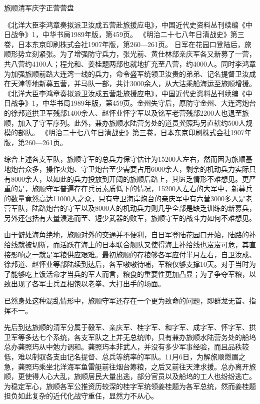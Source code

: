 \documentclass[12pt,UTF8]{ctexbook}
\begin{document}
旅顺清军庆字正营营盘

《北洋大臣李鸿章奏拟派卫汝成五营赴旅援应电》，中国近代史资料丛刊续编《中日战争》1，中华书局1989年版，第459页。
《明治二十七八年日清战史》第三卷，日本东京印刷株式会社1907年版，第260—261页。
日军在花园口登陆后，旅顺形势立刻紧张。为了增强防守兵力，张光前、黄仕林部亲庆军各又新募了一营，共八营约4100人；程允和、姜桂题两部也就地扩充至八营，约4000人。同时李鸿章为加强旅顺前路大连湾一线的兵力，命令盛军统领卫汝贵的弟弟、记名提督卫汝成在天津等地新募五营，并马队一部，共计3000余人，从大沽乘船海运至旅顺增援。 《北洋大臣李鸿章奏拟派卫汝成五营赴旅援应电》，中国近代史资料丛刊续编《中日战争》1，中华书局1989年版，第459页。金州失守后，原防守金州、大连湾炮台的徐邦道拱卫军残部1400余人、赵怀业怀字军以及铭军老营残部2200人也退至旅顺，加入了守军序列。此外，兼办旅顺水陆营务处的道员龚照玙另直辖约500人规模的部队。 《明治二十七八年日清战史》第三卷，日本东京印刷株式会社1907年版，第260—261页。

综合上述各支军队，旅顺守军的总兵力保守估计为15200人左右，然而因为旅顺基地炮台众多，操作火炮、守卫炮台至少需要占用6000余人，剩余的机动兵力实际只有8000余人，以如此的兵力投放到开阔的旅顺后路上，其匮乏情形不难想见。更严重的是，旅顺守军普遍存在兵员素质低下的情况，15200人左右的大军中，新募兵的数量竟然高达11000人之众，只有守卫海岸炮台的亲庆军中有六营3000多人是老营军队，陆路炮台的守军以及8000人的机动兵力则几乎全部是缺乏训练的新募兵，另外还包括有大量溃逃而至、短少武器的败军，旅顺守军的战斗力如何不难想见。

由于僻处海角绝地，旅顺对外的交通并不便利，自日军登陆花园口开始，陆路的补给线就被切断，而活跃在海上的日本联合舰队又使得海上补给线也岌岌可危，其直接影响之一就是军粮供应艰难。最初旅顺的存粮够各军应付半月左右，自卫汝成、徐邦道、赵怀业等部陆续到达后，各军嗷嗷待哺，军粮仅够支撑10天。对于当时为了能够吃上饭活命才当兵的军人而言，粮食的重要性更加凸显；为了争夺军粮，以致出现了各军士兵互相饱以老拳、大打出手的场面。

已然身处这种混乱情形中，旅顺守军还存在一个更为致命的问题，即群龙无首、指挥不一。

先后到达旅顺的清军分属于毅军、亲庆军、桂字军、和字军、成字军、怀字军、拱卫军等多达七个系统，各支军队之上并无总统帅，只有兼办旅顺水陆营务处的船坞总办龚照玙从中勉力调和。龚照玙本非武人，并没有多少军事经验，而且品秩较低，难以制驭各支由记名提督、总兵等统率的军队。11月6日，为解旅顺燃眉之急，龚照玙乘坐北洋海军鱼雷艇前往烟台筹粮，之后又前往天津求援。总办离开旅顺，更使得人心大乱，旅顺居民大量出逃，部分官员以及船坞的工人也纷纷逃亡。为稳定军心，旅顺各军公推资历较深的桂字军统领姜桂题为各军总统，然而姜桂题担负如此复杂的近代化战守重任，显然力不从心。
\end{document}
